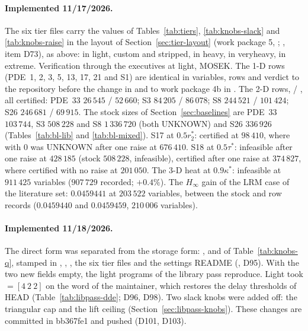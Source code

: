 \paragraph{Implemented 11/17/2026.} The six tier files carry the values of Tables~\ref{tab:tiers}, \ref{tab:knobs-slack} and \ref{tab:knobs-raise} in the layout of Section~\ref{sec:tier-layout} (work package 5, ; , item D73),  as above:  in light, custom and stripped,  in heavy,  in veryheavy,  in extreme. Verification through the executives at light, MOSEK. The 1-D rows (PDE~1, 2, 3, 5, 13, 17, 21 and S1) are identical in variables, rows and verdict to the repository before the change in  and to work package 4b in . The 2-D rows,  / , all certified: PDE~33 $26\,545$ / $52\,660$; S3 $84\,205$ / $86\,078$; S8 $244\,521$ / $101\,424$; S26 $246\,681$ / $69\,915$. The stock sizes of Section~\ref{sec:baselines} are PDE~33 $103\,744$, S3 $508\,228$ and S8 $1\,336\,720$ (both UNKNOWN) and S26 $336\,926$ (Tables~\ref{tab:bl-lib} and \ref{tab:bl-mixed}). S17 at $0.5r_2^*$:  certified at $98\,410$, where  with  $0$ was UNKNOWN after one raise at $676\,410$. S18 at $0.5\tau^*$:  infeasible after one raise at $428\,185$ (stock $508\,228$, infeasible),  certified after one raise at $374\,827$, where  certified with no raise at $201\,050$. The 3-D heat at $0.9\kappa^*$:  infeasible at $911\,425$ variables ($907\,729$ recorded; $+0.4\%$). The $H_\infty$ gain of the LRM case of the literature set: $0.0459441$ at $203\,522$ variables, between the stock and row records ($0.0459440$ and $0.0459459$, $210\,006$ variables).

\paragraph{Implemented 11/18/2026.} The direct form was separated from the storage form: ,  and  of Table~\ref{tab:knobs-q}, stamped in , , , the six tier files and the settings README (, D95). With the two new fields empty, the light programs of the library pass reproduce. Light took  $=[4\ 2\ 2]$ on the word of the maintainer, which restores the delay thresholds of HEAD (Table~\ref{tab:libpass-dde}; D96, D98). Two slack knobs were added off: the triangular cap  and the lift ceiling  (Section~\ref{sec:libpass-knobs}). These changes are committed in bb367fe1 and pushed (D101, D103).

